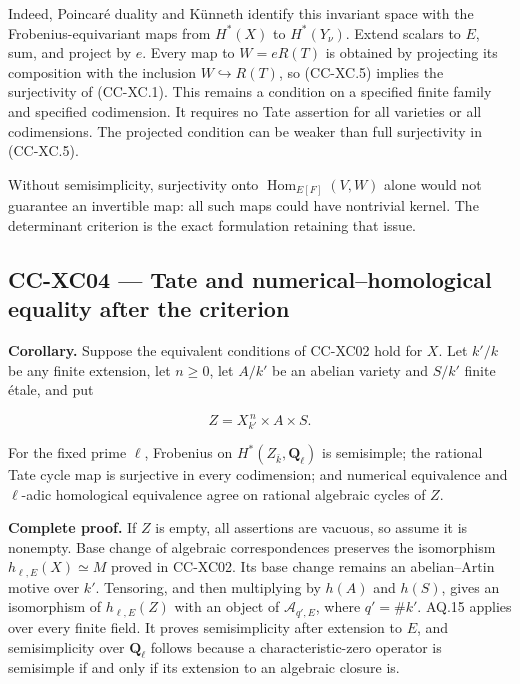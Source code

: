 \documentclass[11pt,a4paper]{article}
\theoremstyle{definition}\newtheorem{definition}[theorem]{Definition}
\theoremstyle{remark}\newtheorem{remark}[theorem]{Remark}
\begin{document}
Indeed, Poincaré duality and Künneth identify this invariant space with
the Frobenius-equivariant maps from \(H^*(X)\) to \(H^*(Y_\nu)\). Extend
scalars to \(E\), sum, and project by \(e\). Every map to \(W=eR(T)\) is
obtained by projecting its composition with the inclusion
\(W\hookrightarrow R(T)\), so (CC-XC.5) implies the surjectivity of
(CC-XC.1). This remains a condition on a specified finite family and
specified codimension. It requires no Tate assertion for all varieties
or all codimensions. The projected condition can be weaker than full
surjectivity in (CC-XC.5).

Without semisimplicity, surjectivity onto
\(\operatorname{Hom}_{E[F]}(V,W)\) alone would not guarantee an
invertible map: all such maps could have nontrivial kernel. The
determinant criterion is the exact formulation retaining that issue.

\subsection{CC-XC04 --- Tate and numerical--homological equality after
the
criterion}\label{cc-xc04-tate-and-numericalhomological-equality-after-the-criterion}

\textbf{Corollary.} Suppose the equivalent conditions of CC-XC02 hold
for \(X\). Let \(k'/k\) be any finite extension, let \(n\ge0\), let
\(A/k'\) be an abelian variety and \(S/k'\) finite étale, and put

\[
 Z=X_{k'}^{\,n}\times A\times S.
\]

For the fixed prime \(\ell\), Frobenius on
\(H^*(Z_{\bar k},\mathbf Q_\ell)\) is semisimple; the rational Tate
cycle map is surjective in every codimension; and numerical equivalence
and \(\ell\)-adic homological equivalence agree on rational algebraic
cycles of \(Z\).

\textbf{Complete proof.} If \(Z\) is empty, all assertions are vacuous,
so assume it is nonempty. Base change of algebraic correspondences
preserves the isomorphism \(h_{\ell,E}(X)\simeq M\) proved in CC-XC02.
Its base change remains an abelian--Artin motive over \(k'\). Tensoring,
and then multiplying by \(h(A)\) and \(h(S)\), gives an isomorphism of
\(h_{\ell,E}(Z)\) with an object of \(\mathcal A_{q',E}\), where
\(q'=\#k'\). AQ.15 applies over every finite field. It proves
semisimplicity after extension to \(E\), and semisimplicity over
\(\mathbf Q_\ell\) follows because a characteristic-zero operator is
semisimple if and only if its extension to an algebraic closure is.
\end{document}
